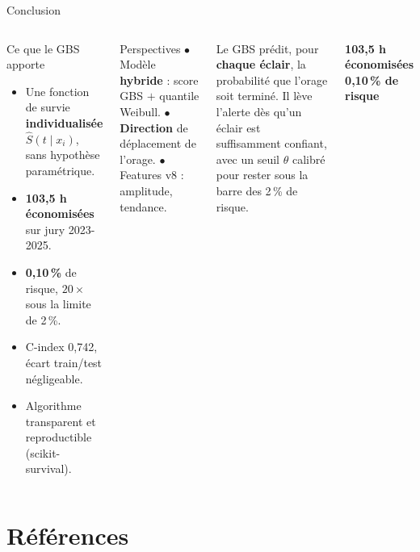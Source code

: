 \documentclass[aspectratio=169,t,11pt]{beamer}
\begin{document}
\begin{frame}{Conclusion}
\vspace{-2pt}
\begin{columns}[T]

\begin{exampleblock}{Ce que le GBS apporte}
\small
\begin{itemize}\setlength\itemsep{2pt}
  \item[\checkmark] Une fonction de survie \textbf{individualisée} $\hat{S}(t \mid x_i)$,
                   sans hypothèse paramétrique.
  \item[\checkmark] \textbf{103,5 h économisées} sur jury 2023-2025.
  \item[\checkmark] \textbf{0,10\,\%} de risque, $20\times$ sous la limite de 2\,\%.
  \item[\checkmark] C-index 0,742, écart train/test négligeable.
  \item[\checkmark] Algorithme transparent et reproductible (scikit-survival).
\end{itemize}
\end{exampleblock}
\vspace{4pt}
\begin{alertblock}{Perspectives}
\scriptsize
$\bullet$ Modèle \textbf{hybride} : score GBS $+$ quantile Weibull.
$\bullet$ \textbf{Direction} de déplacement de l'orage. $\bullet$ Features v8 : amplitude, tendance.
\end{alertblock}

\begin{tcolorbox}[mybox,colback=metBlue!8,colframe=metBlue,
  title={Message clé}]
\small
Le GBS prédit, pour \textbf{chaque éclair}, la probabilité que
l'orage soit terminé. Il lève l'alerte dès qu'un éclair est
suffisamment confiant, avec un seuil $\theta$ calibré pour rester
sous la barre des 2\,\% de risque.
\end{tcolorbox}
\vspace{6pt}
\begin{tcolorbox}[mybox,colback=metGreen!12,colframe=metGreen,
  halign=center,top=6pt,bottom=6pt]
\normalsize\bfseries\color{metGreen}
103,5 h économisées\\[3pt]
0,10\,\% de risque
\end{tcolorbox}
\end{columns}
\end{frame}

\section{Références}
\end{document}
